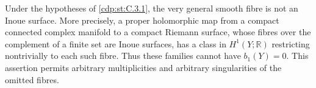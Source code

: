 \begin{proposition}\hypertarget{tag-01F7}{}\label{cdp:st:C.3.12}



Under the hypotheses of \ref{cdp:st:C.3.1}, the very general smooth fibre is
not an Inoue surface. More precisely, a proper holomorphic map from
a compact connected complex manifold to a compact Riemann surface,
whose fibres over the complement of a finite set are Inoue surfaces,
has a class in $H^1(Y;\mathbb R)$ restricting nontrivially to each
such fibre. Thus these families cannot have $b_1(Y)=0$.
This assertion permits arbitrary multiplicities and arbitrary
singularities of the omitted fibres.
\end{proposition}

